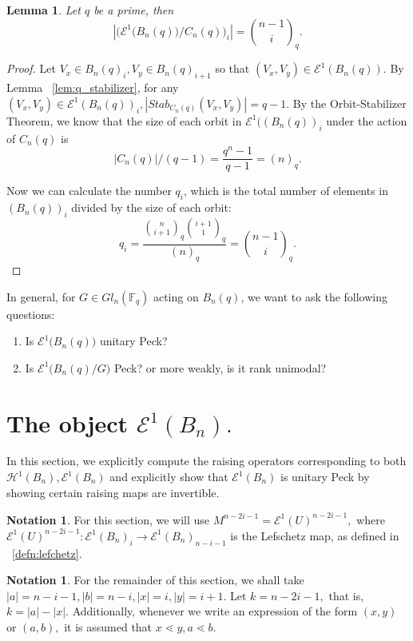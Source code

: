 \documentclass[10 pt]{amsart}
\theoremstyle{plain}
\newtheorem{lem}[thm]{Lemma}
\theoremstyle{definition}
\newtheorem{note}[thm]{Notation}
\theoremstyle{remark}
\numberwithin{equation}{section}
\newcommand\BF{{\mathbb F}}
\begin{document}
\begin{lem} 
\label{lem:cyclic_q_analog_ranks}
Let $q$ be a prime,  then $$ |\big( \mathcal E^1 \big(B_n(q)\big)/C_n(q) \big)_i| = {n-1 \choose i}_q.$$
\end{lem}

\begin{proof}

Let $V_x \in B_n(q)_i,V_y \in B_n(q)_{i+1}$ so that $(V_x, V_y) \in \mathcal E^1 (B_n(q))$. By Lemma ~\ref{lem:q_stabilizer}, for any $(V_x, V_y) \in \mathcal E ^1 (B_n(q))_i,|Stab_{C_n(q)}(V_x, V_y)|=q-1.$  By the Orbit-Stabilizer Theorem, we know that the size of each orbit in $\mathcal E^1 ((B_n(q))_i$ under the action of $C_n(q)$ is $$|C_n(q)|/(q-1) = \frac{q^n-1}{q-1} = (n)_q.$$

Now we can calculate the number $q_i$, which is the total number of elements in $(B_n(q))_i$ divided by the size of each orbit:$$q_i = \frac{{n \choose i+1}_q {i+1 \choose 1}_q}{(n)_q} = {n-1 \choose i}_q. $$
\end{proof}

In general, for $G \in Gl_n(\BF_q)$ acting on $B_n(q)$, we want to ask the following questions:

\begin{enumerate}
\item Is $\mathcal E^1 \big(B_n(q)\big)$ unitary Peck? 
\item Is $\mathcal E^1 \big(B_n(q) /G\big)$ Peck? or more weakly, is it rank unimodal?
\end{enumerate}









\section{The object $\mathcal E^1(B_n).$}
\label{sec:unitary_peck_f}
In this section, we explicitly compute the raising operators corresponding to both $\mathcal H^1(B_n),\mathcal E^1(B_n)$ and explicitly show that $\mathcal E^1(B_n)$ is unitary Peck by showing certain raising maps are invertible.

\begin{note}
For this section, we will use $M^{n-2i-1} = \mathcal E^1(U)^{n-2i-1},$ where $\mathcal E^1(U)^{n-2i-1}:\mathcal E^1(B_n)_i \rightarrow \mathcal E^1(B_n)_{n-i-1}$ is the Lefschetz map, as defined in ~\ref{defn:lefchetz}.
\end{note}
\begin{note}
For the remainder of this section, we shall take $|a| = n-i-1,|b|= n-i,|x| = i,|y| = i+1.$ Let $k = n-2i-1,$ that is, $k = |a| - |x|.$ Additionally, whenever we write an expression of the form $(x, y)$ or $(a, b),$ it is assumed that $x \lessdot y,a \lessdot b.$
\end{note}
\end{document}
